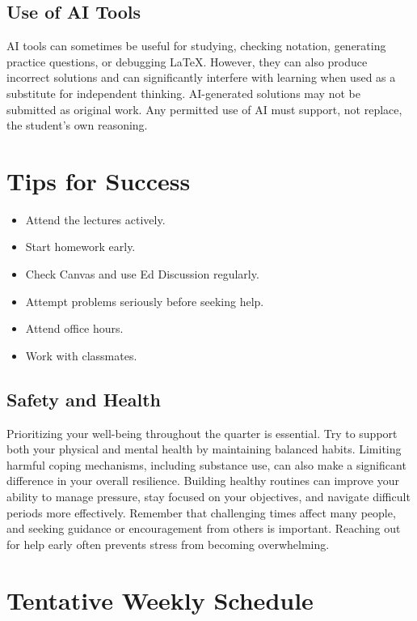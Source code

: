 \documentclass[11pt]{article}
\begin{document}
\subsection*{Use of AI Tools}

AI tools can sometimes be useful for studying, checking notation, generating practice questions, or debugging LaTeX. However, they can also produce incorrect solutions and can significantly interfere with learning  when used as a substitute for independent thinking. AI-generated solutions may not be submitted as original work. Any permitted use of AI must support, not replace, the student's own reasoning. 

\section{Tips for Success}

\begin{itemize}[leftmargin=*]
\item Attend the lectures actively.
    \item Start homework early. 
        \item Check Canvas and use Ed Discussion regularly.

    \item Attempt problems seriously before seeking help.
    \item Attend office hours.
    \item Work with classmates.
\end{itemize}

\subsection*{Safety and Health}
Prioritizing your well-being throughout the quarter is essential. Try to support both your physical and mental health by maintaining balanced habits. Limiting harmful coping mechanisms, including substance use, can also make a significant difference in your overall resilience. Building healthy routines can improve your ability to manage pressure, stay focused on your objectives, and navigate difficult periods more effectively. Remember that challenging times affect many people, and seeking guidance or encouragement from others is important. Reaching out for help early often prevents stress from becoming overwhelming.


\newpage

\renewcommand{\arraystretch}{1.24}
\section{Tentative Weekly Schedule}
\end{document}
